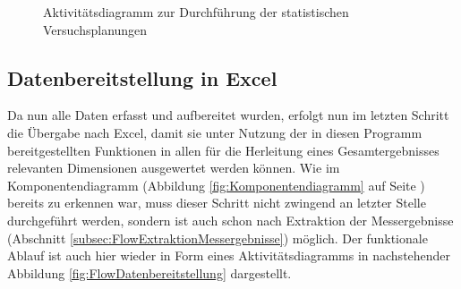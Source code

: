 \documentclass[
fontsize=10pt, 
listof = totoc,
parskip = half	
]{report}
\begin{document}
\begin{figure}[H]
	\centering
	\caption{Aktivitätsdiagramm zur Durchführung der statistischen Versuchsplanungen}
	\label{fig:FlowVersuchsplanung}
\end{figure}

\subsection{Datenbereitstellung in Excel}
\label{subsec:FlowDataToExcel}

Da nun alle Daten erfasst und aufbereitet wurden, erfolgt nun im letzten Schritt die Übergabe nach Excel, damit sie unter Nutzung der in diesen Programm bereitgestellten Funktionen in allen für die Herleitung eines Gesamtergebnisses relevanten Dimensionen ausgewertet werden können. Wie im Komponentendiagramm (Abbildung \ref{fig:Komponentendiagramm} auf Seite \pageref{fig:Komponentendiagramm}) bereits zu erkennen war, muss dieser Schritt nicht zwingend an letzter Stelle durchgeführt werden, sondern ist auch schon nach Extraktion der Messergebnisse (Abschnitt \ref{subsec:FlowExtraktionMessergebnisse}) möglich. Der funktionale Ablauf ist auch hier wieder in Form eines Aktivitätsdiagramms in nachstehender Abbildung \ref{fig:FlowDatenbereitstellung} dargestellt.
\end{document}
